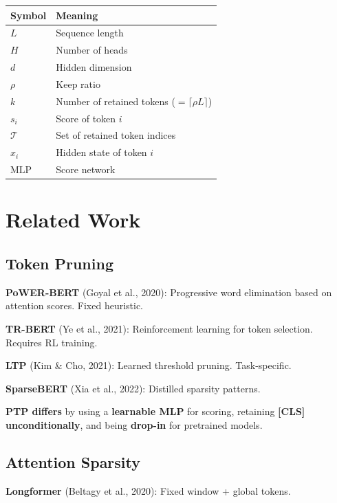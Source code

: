 \begin{table}[H]
\centering
\small
\begin{tabular}{ll}
\toprule
\textbf{Symbol} & \textbf{Meaning} \\
\midrule
$L$ & Sequence length \\
$H$ & Number of heads \\
$d$ & Hidden dimension \\
$\rho$ & Keep ratio \\
$k$ & Number of retained tokens ($= \lceil \rho L \rceil$) \\
$s_i$ & Score of token $i$ \\
$\mathcal{T}$ & Set of retained token indices \\
$x_i$ & Hidden state of token $i$ \\
$\text{MLP}$ & Score network \\
\bottomrule
\end{tabular}
\end{table}




\section{Related Work}

\subsection{Token Pruning}

\textbf{PoWER-BERT} (Goyal et al., 2020): Progressive word elimination based on 
attention scores. Fixed heuristic.

\textbf{TR-BERT} (Ye et al., 2021): Reinforcement learning for token selection. 
Requires RL training.

\textbf{LTP} (Kim \& Cho, 2021): Learned threshold pruning. Task-specific.

\textbf{SparseBERT} (Xia et al., 2022): Distilled sparsity patterns.

\textbf{PTP differs} by using a \textbf{learnable MLP} for scoring, retaining 
\textbf{[CLS] unconditionally}, and being \textbf{drop-in} for pretrained models.

\subsection{Attention Sparsity}

\textbf{Longformer} (Beltagy et al., 2020): Fixed window + global tokens.

